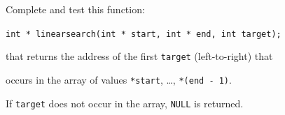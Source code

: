 Complete and test this function:



\verb!int * linearsearch(int * start, int * end, int target);!



that returns the address of the first \texttt{target} (left-to-right) that

occurs in the array of values \texttt{*start}, \ldots, \texttt{*(end - 1)}.

If \texttt{target} does not occur in the array, \texttt{NULL} is returned.

